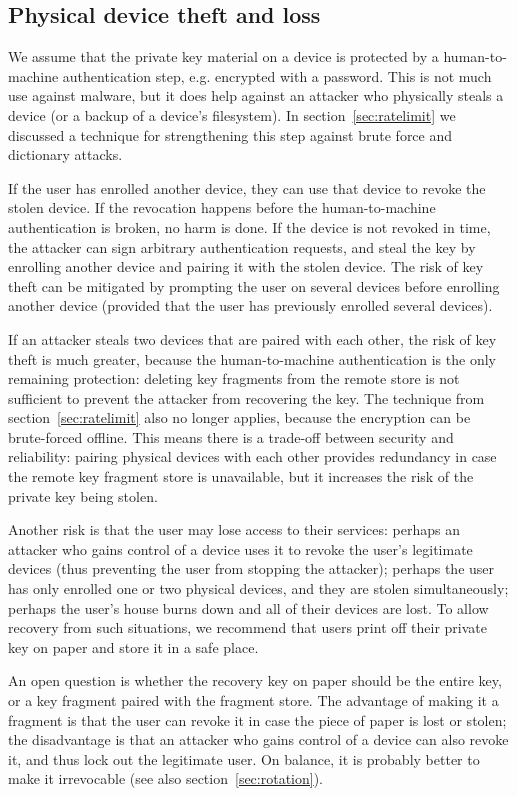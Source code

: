 \subsection{Physical device theft and loss}\label{sec:theftloss}

We assume that the private key material on a device is protected by a human-to-machine
authentication step, e.g. encrypted with a password. This is not much use against malware, but it
does help against an attacker who physically steals a device (or a backup of a device's filesystem).
In section~\ref{sec:ratelimit} we discussed a technique for strengthening this step against brute
force and dictionary attacks.

If the user has enrolled another device, they can use that device to revoke the stolen device. If
the revocation happens before the human-to-machine authentication is broken, no harm is done. If the
device is not revoked in time, the attacker can sign arbitrary authentication requests, and steal
the key by enrolling another device and pairing it with the stolen device. The risk of key theft can
be mitigated by prompting the user on several devices before enrolling another device (provided that
the user has previously enrolled several devices).

If an attacker steals two devices that are paired with each other, the risk of key theft is much
greater, because the human-to-machine authentication is the only remaining protection: deleting key
fragments from the remote store is not sufficient to prevent the attacker from recovering the key.
The technique from section~\ref{sec:ratelimit} also no longer applies, because the encryption can be
brute-forced offline. This means there is a trade-off between security and reliability: pairing
physical devices with each other provides redundancy in case the remote key fragment store is
unavailable, but it increases the risk of the private key being stolen.

Another risk is that the user may lose access to their services: perhaps an attacker who gains
control of a device uses it to revoke the user's legitimate devices (thus preventing the user from
stopping the attacker); perhaps the user has only enrolled one or two physical devices, and they are
stolen simultaneously; perhaps the user's house burns down and all of their devices are lost. To
allow recovery from such situations, we recommend that users print off their private key on paper
and store it in a safe place.

An open question is whether the recovery key on paper should be the entire key, or a key fragment
paired with the fragment store. The advantage of making it a fragment is that the user can revoke it
in case the piece of paper is lost or stolen; the disadvantage is that an attacker who gains control
of a device can also revoke it, and thus lock out the legitimate user. On balance, it is probably
better to make it irrevocable (see also section~\ref{sec:rotation}).


